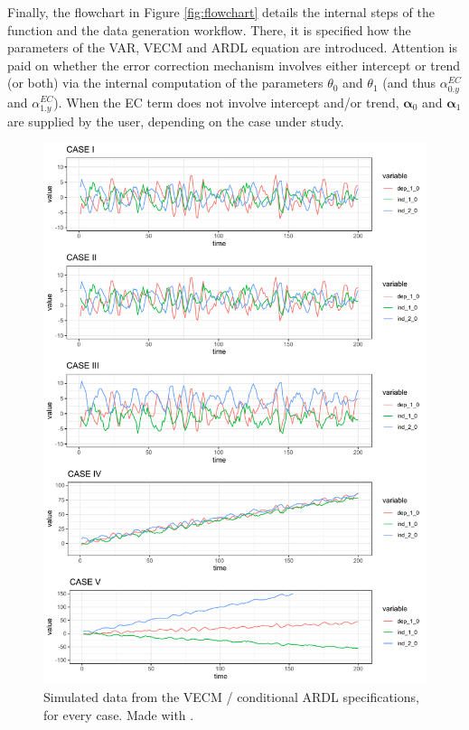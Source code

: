 Finally, the flowchart in Figure \ref{fig:flowchart} details the internal steps of the function  and the data generation workflow. There, it is specified how the parameters of the VAR, VECM and ARDL equation are introduced. Attention is paid on whether the error correction mechanism involves either intercept or trend (or both) via the internal computation of the parameters $\theta_0$ and $\theta_1$ (and thus $\alpha_{0.y}^{EC}$ and $\alpha_{1.y}^{EC}$). When the EC term does not involve intercept and/or trend, $\boldsymbol\alpha_0$ and $\boldsymbol\alpha_1$ are supplied by the user, depending on the case under study.  
\begin{figure}[ht!]
\begin{center}
\includegraphics[width=13.5cm]{figures/sim_ts}
\end{center}
\caption{Simulated data from the VECM / conditional ARDL specifications, for every case. Made with  \citep{ggplot}.}
\label{fig:sim}
\end{figure}

